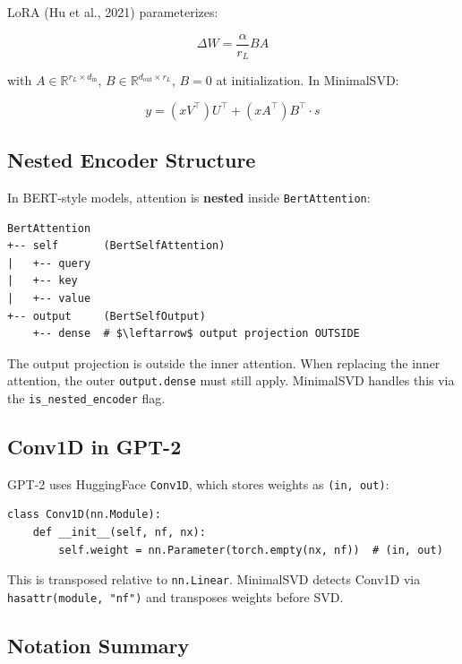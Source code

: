 LoRA (Hu et al., 2021) parameterizes:

\[
\Delta W = \frac{\alpha}{r_L} B A
\tag{3.10}
\]

with $A \in \mathbb{R}^{r_L \times d_\text{in}}$, $B \in \mathbb{R}^{d_\text{out} \times r_L}$, 
$B = 0$ at initialization. In MinimalSVD:

\[
y = (x V^\top) U^\top + (x A^\top) B^\top \cdot s
\tag{3.11}
\]

\subsection{Nested Encoder Structure}

In BERT-style models, attention is \textbf{nested} inside \texttt{BertAttention}:

\begin{lstlisting}
BertAttention
+-- self       (BertSelfAttention)
|   +-- query
|   +-- key
|   +-- value
+-- output     (BertSelfOutput)
    +-- dense  # $\leftarrow$ output projection OUTSIDE
\end{lstlisting}

The output projection is outside the inner attention. When replacing the 
inner attention, the outer \texttt{output.dense} must still apply. MinimalSVD 
handles this via the \texttt{is\_nested\_encoder} flag.

\subsection{Conv1D in GPT-2}

GPT-2 uses HuggingFace \texttt{Conv1D}, which stores weights as \texttt{(in, out)}:

\begin{lstlisting}
class Conv1D(nn.Module):
    def __init__(self, nf, nx):
        self.weight = nn.Parameter(torch.empty(nx, nf))  # (in, out)
\end{lstlisting}

This is transposed relative to \texttt{nn.Linear}. MinimalSVD detects Conv1D via 
\texttt{hasattr(module, "nf")} and transposes weights before SVD.

\subsection{Notation Summary}

